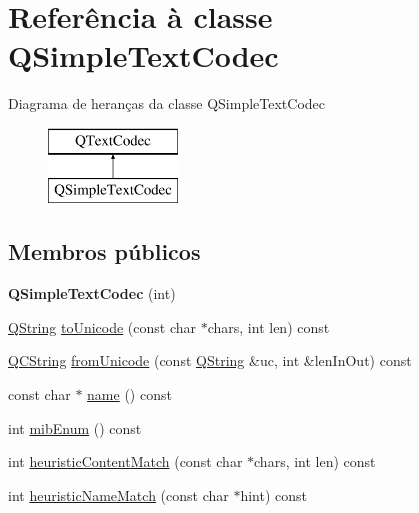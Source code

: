 \hypertarget{class_q_simple_text_codec}{\section{Referência à classe Q\-Simple\-Text\-Codec}
\label{class_q_simple_text_codec}
}
Diagrama de heranças da classe Q\-Simple\-Text\-Codec\begin{figure}[H]
\begin{center}
\leavevmode
\includegraphics[height=2.000000cm]{class_q_simple_text_codec}
\end{center}
\end{figure}
\subsection*{Membros públicos}
\begin{DoxyCompactItemize}
\item 
\hypertarget{class_q_simple_text_codec_a19e21c6a73f70d9bde20cc5c6d38c77d}{{\bfseries Q\-Simple\-Text\-Codec} (int)}\label{class_q_simple_text_codec_a19e21c6a73f70d9bde20cc5c6d38c77d}

\item 
\hyperlink{class_q_string}{Q\-String} \hyperlink{class_q_simple_text_codec_a007974789d47a38acb95816cd5486c8c}{to\-Unicode} (const char $\ast$chars, int len) const 
\item 
\hyperlink{class_q_c_string}{Q\-C\-String} \hyperlink{class_q_simple_text_codec_a2c6f9097505dec2780031e680be1c835}{from\-Unicode} (const \hyperlink{class_q_string}{Q\-String} \&uc, int \&len\-In\-Out) const 
\item 
const char $\ast$ \hyperlink{class_q_simple_text_codec_a25844783e4bef74ca9a17519c239a27e}{name} () const 
\item 
int \hyperlink{class_q_simple_text_codec_a5272a4ca2c3d9cdba1c3f2fac3e4d6bd}{mib\-Enum} () const 
\item 
int \hyperlink{class_q_simple_text_codec_ab3ad57260f7cb722cb3b237369d23044}{heuristic\-Content\-Match} (const char $\ast$chars, int len) const 
\item 
int \hyperlink{class_q_simple_text_codec_a7fb3e310dd10564c6a7e2b707a336bbf}{heuristic\-Name\-Match} (const char $\ast$hint) const 
\end{DoxyCompactItemize}
